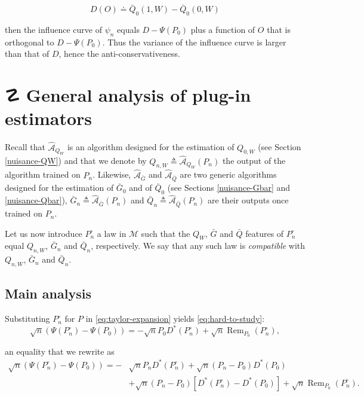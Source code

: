 \documentclass[11pt,openright,twoside]{book}
\DeclareMathOperator{\Rem}{Rem}
\DeclareRobustCommand{\stixdanger}{%
  {\usefont{U}{stixbbit}{m}{it}\symbol{"F6}}%
}
\newcommand{\Algo}{\widehat{\mathcal{A}}}
\newcommand{\defq}{\doteq}
\newcommand{\calM}{\mathcal{M}}
\newcommand{\Gbar}{\bar{G}}
\newcommand{\Phat}{P^{\circ}}
\newcommand{\Qbar}{\bar{Q}}
\theoremstyle{definition}
\theoremstyle{definition}
\theoremstyle{definition}
\theoremstyle{remark}
\begin{document}
\begin{equation*}
D(O) \defq \Qbar_{0}(1,W) - \Qbar_{0}(0,W)
\end{equation*}

then the influence curve of \(\psi_{n}\) equals \(D - \Psi(P_{0})\) plus a
function of \(O\) that is orthogonal to \(D - \Psi(P_{0})\). Thus the variance of
the influence curve is larger than that of \(D\), hence the
anti-conservativeness.

\hypertarget{app-analysis-of-plug-in}{%
\section{\texorpdfstring{☡ \stixdanger{} General analysis of plug-in estimators}{☡  General analysis of plug-in estimators}}\label{app-analysis-of-plug-in}}

Recall that \(\Algo_{Q_{W}}\) is an algorithm designed for the estimation of
\(Q_{0,W}\) (see Section \ref{nuisance-QW}) and that we denote by \(Q_{n,W} \triangleq \Algo_{Q_{W}}(P_{n})\) the output of the algorithm trained on \(P_{n}\).
Likewise, \(\Algo_{\Gbar}\) and \(\Algo_{\Qbar}\) are two generic algorithms
designed for the estimation of \(\Gbar_{0}\) and of \(\Qbar_{0}\) (see Sections
\ref{nuisance-Gbar} and \ref{nuisance-Qbar}), \(\Gbar_{n} \triangleq \Algo_{\Gbar}(P_{n})\) and \(\Qbar_{n} \triangleq \Algo_{\Qbar}(P_{n})\) are their
outputs once trained on \(P_{n}\).

Let us now introduce \(\Phat_n\) a law in \(\calM\) such that the \(Q_{W}\), \(\Gbar\)
and \(\Qbar\) features of \(\Phat_n\) equal \(Q_{n,W}\), \(\Gbar_{n}\) and
\(\Qbar_{n}\), respectively. We say that any such law is \emph{compatible} with
\(Q_{n,W}\), \(\Gbar_n\) and \(\Qbar_n\).

\hypertarget{app-analysis-of-plug-in-main}{%
\subsection{Main analysis}\label{app-analysis-of-plug-in-main}}

Substituting \(\Phat_n\) for \(P\) in \eqref{eq:taylor-expansion} yields
\eqref{eq:hard-to-study}:
\begin{equation} 
\sqrt{n} (\Psi(\Phat_n) - \Psi(P_0)) =  - \sqrt{n} P_0 D^*(\Phat_n) + \sqrt{n}
\Rem_{P_0}(\Phat_n), 
\end{equation}

an equality that we rewrite as
\begin{align} 
\sqrt{n} (\Psi(\Phat_n) - \Psi(P_0)) = - & \sqrt{n} P_n D^*(\Phat_n) + \sqrt{n}
(P_n - P_0) D^*(P_0)\\ & + \sqrt{n}(P_n - P_0) [D^*(\Phat_n) - D^*(P_0)] +
\sqrt{n}\Rem_{P_0}(\Phat_n). 
\end{align}
\end{document}
